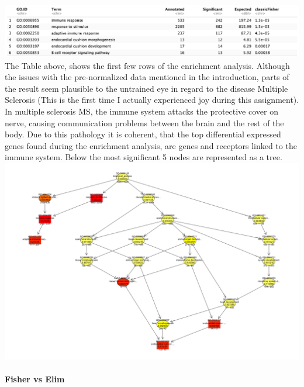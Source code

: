 \documentclass[
]{article}
\begin{document}
\includegraphics{../../plots/SRP164913_topGO_top_6.png} The Table above,
shows the first few rows of the enrichment analysis. Although the issues
with the pre-normalized data mentioned in the introduction, parts of the
result seem plausible to the untrained eye in regard to the disease
Multiple Sclerosis (This is the first time I actually experienced joy
during this assignment). In multiple sclerosis MS, the immune system
attacks the protective cover on nerve, causing communication problems
between the brain and the rest of the body. Due to this pathology it is
coherent, that the top differential expressed genes found during the
enrichment analysis, are genes and receptors linked to the immune
system. Below the most significant 5 nodes are represented as a tree.
\includegraphics{../../plots/SRP164913_topGO_tree.png}

\paragraph{Fisher vs Elim}\label{fisher-vs-elim}
\end{document}
